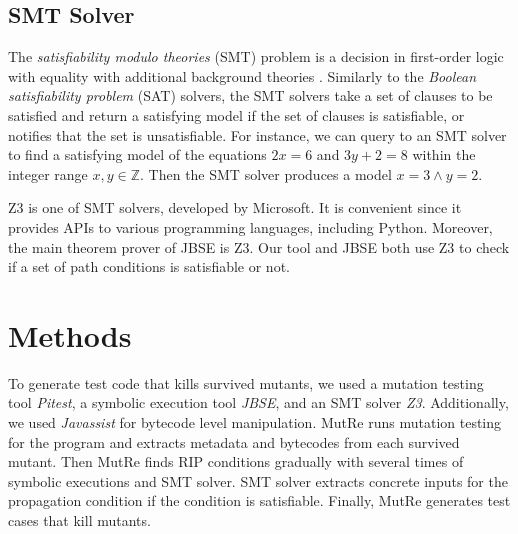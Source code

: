\documentclass{article}
\begin{document}
\subsection{SMT Solver}

The \emph{satisfiability modulo theories} (SMT) problem is a decision in first-order logic with equality with additional background theories \cite{SMT}. Similarly to the \emph{Boolean satisfiability problem} (SAT) solvers, the SMT solvers take a set of clauses to be satisfied and return a satisfying model if the set of clauses is satisfiable, or notifies that the set is unsatisfiable. For instance, we can query to an SMT solver to find a satisfying model of the equations $2x = 6$ and $3y + 2 = 8$ within the integer range $x,y\in\mathbb Z$. Then the SMT solver produces a model $x = 3\land y = 2$.

Z3 \cite{Z3} is one of SMT solvers, developed by Microsoft. It is convenient since it provides APIs to various programming languages, including Python. Moreover, the main theorem prover of JBSE is Z3. Our tool and JBSE both use Z3 to check if a set of path conditions is satisfiable or not.


\section{Methods}

\iffalse

간단한 overview

mutant generation -> JBSE -> parse -> get R condition -> assume & JBSE -> parse -> get I condition -> assume & JBSE -> parse -> get P (thus killing) condition -> model generation (Z3) -> human friendly conversion -> junit test case generation

 - MutRe는 survived mutant를 죽이는 test code를 생성한다.
 - Mutation testing을 실행하여 survived mutant를 추출한다. 각 mutant에 대해 symbolic execution과 SMT solver를 이용하여 RIP condition을 차례대로 구한다. P condition로부터 concrete input을 얻고, test code를 만든다.
 - MutRe는 Mutation testing을 위해 Pitest를 실행한다. Symbolic execution tool로는 JBSE를 사용한다. Path condition이 satisfiable한 지 계산하고 concrete한 input을 얻어내기 위한 SMT solver로는 Z3 solver를 사용한다.
\fi
To generate test code that kills survived mutants, we used a mutation testing tool \emph{Pitest}, a symbolic execution tool \emph{JBSE}, and an SMT solver \emph{Z3}. Additionally, we used \emph{Javassist} for bytecode level manipulation. MutRe runs mutation testing for the program and extracts metadata and bytecodes from each survived mutant. Then MutRe finds RIP conditions gradually with several times of symbolic executions and SMT solver. SMT solver extracts concrete inputs for the propagation condition if the condition is satisfiable. Finally, MutRe generates test cases that kill mutants.
\end{document}
